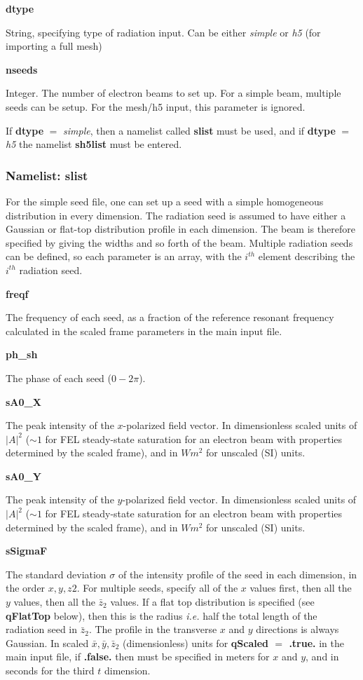 \documentclass[12pt]{article}%
\begin{document}
{\bf dtype}

String, specifying type of radiation input. Can be either {\it simple} or {\it h5} (for importing a full mesh)

{\bf nseeds}

Integer. The number of electron beams to set up. For a simple beam, multiple seeds can be setup. For the mesh/h5 input, this parameter is ignored.

If {\bf dtype} $=$ {\it simple}, then a namelist called {\bf slist} must be used, and if {\bf dtype} $=$ {\it h5} the namelist {\bf sh5list} must be entered.

\subsubsection{Namelist: slist}

For the simple seed file, one can set up a seed with a simple homogeneous distribution in every dimension. The radiation seed is assumed to have either a Gaussian or flat-top distribution profile in each dimension. The beam is therefore specified by giving the widths and so forth of the beam. Multiple radiation seeds can be defined, so each parameter is an array, with the $i^{th}$ element describing the $i^{th}$ radiation seed.


{\bf freqf}

The frequency of each seed, as a fraction of the reference resonant frequency calculated in the scaled frame parameters in the main input file.

{\bf ph\_sh}

The phase of each seed ($0-2\pi$).

{\bf sA0\_X}

The peak intensity of the $x$-polarized field vector. In dimensionless scaled units of $|A|^2$ ($\sim 1$ for FEL steady-state saturation for an electron beam with properties determined by the scaled frame), and in $Wm^2$ for unscaled (SI) units.

{\bf sA0\_Y}

The peak intensity of the $y$-polarized field vector. In dimensionless scaled units of $|A|^2$ ($\sim 1$ for FEL steady-state saturation for an electron beam with properties determined by the scaled frame), and in $Wm^2$ for unscaled (SI) units.

{\bf sSigmaF}

The standard deviation $\sigma$ of the intensity profile of the seed in each dimension, in the order $x, y, z2$. For multiple seeds, specify all of the $x$ values first, then all the $y$ values, then all the $\bar{z}_2$ values. If a flat top distribution is specified (see {\bf qFlatTop} below), then this is the radius \textit{i.e.} half the total length of the radiation seed in $\bar{z}_2$. The profile in the transverse $x$ and $y$ directions is always Gaussian. In scaled $\bar{x}, \bar{y}, \bar{z}_2$ (dimensionless) units for {\bf qScaled $=$ .true.} in the main input file, if {\bf .false.} then must be specified in meters for $x$ and $y$, and in seconds for the third $t$ dimension.
\end{document}
